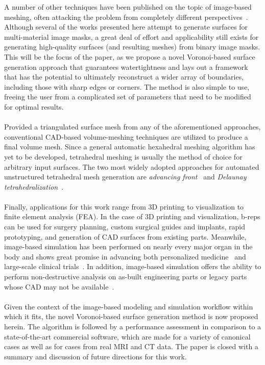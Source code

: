 %
A number of other techniques have been published on the topic of image-based meshing, often attacking the problem from completely different perspectives~\cite{bronson_2014,fang_2009,boissonnat_2009,zhao_2016}. Although several of the works presented here attempt to generate surfaces for multi-material image masks, a great deal of effort and applicability still exists for generating high-quality surfaces (and resulting meshes) from binary image masks. This will be the focus of the paper, as we propose a novel Voronoi-based surface generation approach that guarantees watertightness and lays out a framework that has the potential to ultimately reconstruct a wider array of boundaries, including those with sharp edges or corners. The method is also simple to use, freeing the user from a complicated set of parameters that need to be modified for optimal results. \\ \\
%
Provided a triangulated surface mesh from any of the aforementioned approaches, conventional CAD-based volume-meshing techniques are utilized to produce a final volume mesh. Since a general automatic hexahedral meshing algorithm has yet to be developed, tetrahedral meshing is usually the method of choice for arbitrary input surfaces. The two most widely adopted approaches for automated unstructured tetrahedral mesh generation are \textit{advancing front}~\cite{jin_1993, lohner_1988} and \textit{Delaunay tetrahedralization}~\cite{lohner_1997}. \\ \\
%
Finally, applications for this work range from 3D printing to visualization to finite element analysis (FEA). In the case of 3D printing and visualization, b-reps can be used for surgery planning, custom surgical guides and implants, rapid prototyping, and generation of CAD surfaces from existing parts. Meanwhile, image-based simulation has been performed on nearly every major organ in the body and shows great promise in advancing both personalized medicine~\cite{neal2010current} and large-scale clinical trials~\cite{viceconti2016silico}. In addition, image-based simulation offers the ability to perform non-destructive analysis on as-built engineering parts or legacy parts whose CAD may not be available~\cite{bradley2005advances}.\\ \\
%
Given the context of the image-based modeling and simulation workflow within which it fits, the novel Voronoi-based surface generation method is now proposed herein. The algorithm is followed by a performance assessment in comparison to a state-of-the-art commercial software, which are made for a variety of canonical cases as well as for cases from real MRI and CT data. The paper is closed with a summary and discussion of future directions for this work.
